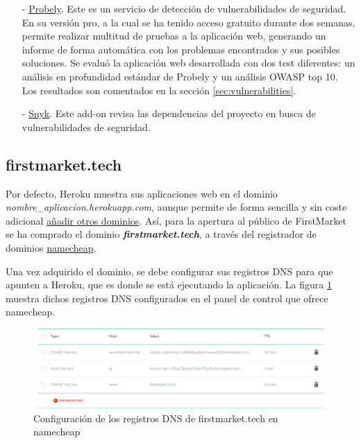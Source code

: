 \documentclass[a4paper]{article}
\begin{document}
\begin{itemize}
       	\item[-] \href{https://elements.heroku.com/addons/probely}{Probely}. Este es un servicio de detección de vulnerabilidades de seguridad. En su versión pro, a la cual se ha tenido acceso gratuito durante dos semanas, permite realizar multitud de pruebas a la aplicación web, generando un informe de forma automática con los problemas encontrados y sus posibles soluciones. Se evaluó la aplicación web desarrollada con dos test diferentes: un análisis en profundidad estándar de Probely y un análisis OWASP top 10. Los resultados son comentados en la sección \ref{sec:vulnerabilities}.
       	\item[-] \href{https://elements.heroku.com/addons/snyk}{Snyk}. Este add-on revisa las dependencias del proyecto en busca de vulnerabilidades de seguridad.
    \end{itemize}

	\subsection{firstmarket.tech}
	Por defecto, Heroku muestra sus aplicaciones web en el dominio \emph{nombre\_aplicacion.herokuapp.com}, aunque permite de forma sencilla y sin coste adicional \href{https://devcenter.heroku.com/articles/custom-domains}{añadir otros dominios}. Así, para la apertura al público de FirstMarket se ha comprado el dominio \textbf{\emph{firstmarket.tech}}, a través del registrador de dominios \href{https://www.namecheap.com/}{namecheap}.
	
	Una vez adquirido el dominio, se debe configurar sus registros DNS para que apunten a Heroku, que es donde se está ejecutando la aplicación. La figura \ref{fig:dns} muestra dichos registros DNS configurados en el panel de control que ofrece namecheap.
	
	\begin{figure}[hbt!]
		\centering
		\includegraphics[width=\textwidth,keepaspectratio]{dns}
		\caption{Configuración de los registros DNS de firstmarket.tech en namecheap}
		\label{fig:dns}
	\end{figure}
\end{document}
